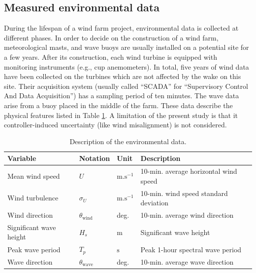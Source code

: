 \subsection{Measured environmental data}
During the lifespan of a wind farm project, environmental data is collected at different phases. 
In order to decide on the construction of a wind farm, meteorological masts, and wave buoys are usually installed on a potential site for a few years. 
After its construction, each wind turbine is equipped with monitoring instruments (e.g., cup anemometers). 
In total, five years of wind data have been collected on the turbines which are not affected by the wake on this site. 
Their acquisition system (usually called ``SCADA'' for ``Supervisory Control And Data Acquisition'') has a sampling period of ten minutes. 
The wave data arise from a buoy placed in the middle of the farm. 
These data describe the physical features listed in Table \ref{tab:envi_variables_c4}. 
A limitation of the present study is that it controller-induced uncertainty (like wind misalignment) is not considered. 

\begin{table} 
    \begin{center}
    \begin{tabularx}{\textwidth}{@{\extracolsep\fill}llll@{}}
    \hline
    Variable & Notation & Unit & Description\\
    \hline
    Mean wind speed & $U$ & $\mathrm{m.s^{-1}}$ & 10-min. average horizontal wind speed\\
    Wind turbulence & $\sigma_U $ & $\mathrm{m.s^{-1}}$ & 10-min. wind speed standard deviation\\
    Wind direction\footnotemark & $\theta_{\mathrm{wind}} $ & deg. &  10-min. average wind direction\\
    Significant wave height & $H_s $ & m & Significant wave height\\
    Peak wave period & $T_p $  & $\mathrm{s}$ & Peak 1-hour spectral wave period \\
    Wave direction & $\theta_{\mathrm{wave}} $ & deg. &  10-min. average wave direction\\
    \hline
    \end{tabularx}
    \caption{Description of the environmental data.}
    \label{tab:envi_variables_c4}
    \end{center}
\end{table}

